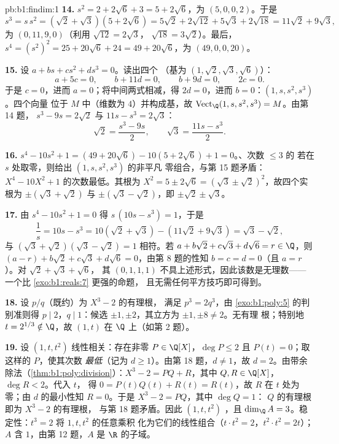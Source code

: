 \begin{solution}{pb:b1:findim:1}
\textbf{14.} $s^2 = 2 + 2\sqrt6 + 3 = 5 + 2\sqrt6$，为
$(5, 0, 0, 2)$。于是
\[
s^3 = s\,s^2 = (\sqrt2 + \sqrt3)(5 + 2\sqrt6)
= 5\sqrt2 + 2\sqrt{12} + 5\sqrt3 + 2\sqrt{18}
= 11\sqrt2 + 9\sqrt3 ,
\]
为 $(0, 11, 9, 0)$（利用 $\sqrt{12} = 2\sqrt3$，
$\sqrt{18} = 3\sqrt2$）。最后，$s^4 = (s^2)^2 = 25 + 20\sqrt6 +
24 = 49 + 20\sqrt6$，为 $(49, 0, 0, 20)$。

\textbf{15.} 设 $a + bs + cs^2 + ds^3 = 0$。读出四个
（基为 $(1, \sqrt2, \sqrt3, \sqrt6)$）：
\[
a + 5c = 0,\qquad b + 11d = 0,\qquad b + 9d = 0,\qquad 2c = 0 .
\]
于是 $c = 0$，进而 $a = 0$；将中间两式相减，得 $2d =
0$，进而 $b = 0$：$(1, s, s^2, s^3)$ 。四个向量
位于 $M$ 中（维数为 $4$）并构成基，故
$\operatorname{Vect}_\Q(1, s, s^2, s^3) = M$。由第 14 题，
$s^3 - 9s = 2\sqrt2$ 与 $11s - s^3 = 2\sqrt3$：
\[
\sqrt2 = \frac{s^3 - 9s}{2},
\qquad
\sqrt3 = \frac{11s - s^3}{2} .
\]

\textbf{16.} $s^4 - 10s^2 + 1 = (49 + 20\sqrt6) - 10(5 +
2\sqrt6) + 1 = 0$。、次数 $\leq 3$ 的
若在 $s$ 处取零，则给出 $(1, s, s^2, s^3)$ 的非平凡
零组合，与第 15 题矛盾：$X^4 - 10X^2 + 1$
的次数最低。其根为 $X^2 = 5 \pm 2\sqrt6 = (\sqrt3 \pm
\sqrt2)^2$，故四个实根为 $\pm(\sqrt3 + \sqrt2)$ 与
$\pm(\sqrt3 - \sqrt2)$，即 $\pm\sqrt2 \pm \sqrt3$。

\textbf{17.} 由 $s^4 - 10s^2 + 1 = 0$ 得 $s\,(10s - s^3) = 1$，于是
\[
\frac1s = 10s - s^3 = 10(\sqrt2 + \sqrt3) - (11\sqrt2 + 9\sqrt3)
= \sqrt3 - \sqrt2 ,
\]
与 $(\sqrt3 + \sqrt2)(\sqrt3 - \sqrt2) = 1$ 相符。若 $a +
b\sqrt2 + c\sqrt3 + d\sqrt6 = r \in \Q$，则 $(a - r) + b\sqrt2
+ c\sqrt3 + d\sqrt6 = 0$，由第 8 题的性知 $b = c
= d = 0$（且 $a = r$）。对 $\sqrt2 + \sqrt3 + \sqrt6$，
其 $(0, 1, 1, 1)$ 不具上述形式，因此该数是无理数——
一个比 \cref{exo:b1:reals:7} 更强的命题，
且无需任何平方技巧即可得到。

\textbf{18.} 设 $p/q$（既约）为 $X^3 - 2$ 的有理根，
满足 $p^3 = 2q^3$，由
\cref{exo:b1:poly:5} 的判别准则得 $p \mid 2$，$q \mid 1$：候选
$\pm1, \pm2$，其立方为 $\pm1, \pm8 \neq 2$。无有理
根；特别地 $t = 2^{1/3} \notin \Q$，故 $(1, t)$ 在
$\Q$ 上（如第 2 题）。

\textbf{19.} 设 $(1, t, t^2)$ 线性相关：存在非零 $P \in
\Q[X]$，$\deg P \leq 2$ 且 $P(t) = 0$；取这样的 $P$，使其次数
\emph{最低}（记为 $d \geq 1$）。由第 18 题，$d \neq 1$，故 $d
= 2$。由带余除法（\cref{thm:b1:poly:division}）：$X^3 - 2
= PQ + R$，其中 $Q, R \in \Q[X]$，$\deg R < 2$。代入 $t$，
得 $0 = P(t)Q(t) + R(t) = R(t)$，故 $R$ 在 $t$ 处为零；由
$d$ 的最小性知 $R = 0$。于是 $X^3 - 2 = PQ$，其中 $\deg Q = 1$：
$Q$ 的有理根即为 $X^3 - 2$ 的有理根，
与第 18 题矛盾。因此 $(1, t, t^2)$ ，且
$\dim_\Q A = 3$。稳定性：$t^3 = 2$ 将 $1, t, t^2$ 的任意乘积
化为它们的线性组合（$t\cdot t^2 = 2$，$t^2\cdot
t^2 = 2t$）；$A$ 含 $1$，由第 12 题，$A$ 是
$\R$ 的子域。


\end{solution}
